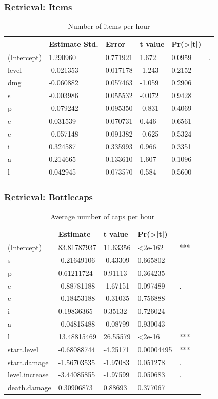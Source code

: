 \documentclass{beamer}
\begin{document}
\begin{frame}
  \frametitle{Retrieval: Items}
  \begin{table}
\caption{Number of items per hour}
\label{table:n.items}
\begin{tabular}{l|lllll}
&Estimate Std.&Error&t value&Pr(>|t|) &\\ 
\hline
(Intercept)&1.290960 &0.771921 &1.672&0.0959&.\\
level&-0.021353  & 0.017178 & -1.243 &  0.2152&  \\
dmg&-0.060882  & 0.057463 & -1.059 &  0.2906&  \\
s&-0.003986  & 0.055532 & -0.072  & 0.9428&  \\
p&-0.079242 &  0.095350 & -0.831 &  0.4069 & \\
e&0.031539 &  0.070731 &  0.446  & 0.6561&  \\
c& -0.057148  & 0.091382 & -0.625 &  0.5324&  \\
i&0.324587&0.335993&   0.966&   0.3351&  \\
a&0.214665&0.133610 &  1.607&   0.1096&  \\
l&0.042945&0.073570&0.584&0.5600&\\
\hline
\end{tabular}
\end{table}
\end{frame}


\begin{frame}
  \frametitle{Retrieval: Bottlecaps}
  \begin{table}
\caption{Average number of caps per hour}
\label{table:caps}
\begin{tabular}{l|lllll}
&Estimate&t value&Pr(>|t|)&\\  
\hline  
(Intercept)&83.81787937  &  11.63356 &<2e-162& ***\\
s &-0.21649106   & -0.43309 &    0.665802 &   \\
p&  0.61211724    & 0.91113 &   0.364235 &   \\
e & -0.88781188    &-1.67151 &   0.097489 &  . \\
c&-0.18453188  &  -0.31035  &  0.756888 &   \\
i& 0.19836365    & 0.35132  &  0.726024 &   \\
a  & -0.04815488  & -0.08799 &   0.930043&    \\
l &   13.48815469   & 26.55579&  <2e-16& ***\\
start.level &  -0.68088744   &  -4.25171 &   0.00004495 & *** \\ 
start.damage& -1.56703535   & -1.97083 &   0.051278 & . \\ 
level.increase & -3.44085855  & -1.97599 &   0.050683 &.  \\ 
death.damage & 0.30906873   &  0.88693  &  0.377067&\\
\hline
\end{tabular}
\end{table}
\end{frame}
\end{document}
